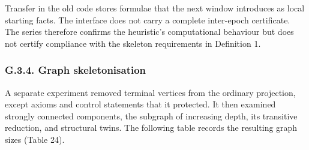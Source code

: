 \documentclass[pdflatex,sn-basic,Numbered]{sn-jnl}
\begin{document}
Transfer in the old code stores formulae that the next window introduces as local starting facts. The interface does not carry a complete inter-epoch certificate. The series therefore confirms the heuristic's computational behaviour but does not certify compliance with the skeleton requirements in Definition 1.

\subsubsection*{G.3.4. Graph skeletonisation}\label{g.3.4.-graph-skeletonisation}

A separate experiment removed terminal vertices from the ordinary projection, except axioms and control statements that it protected. It then examined strongly connected components, the subgraph of increasing depth, its transitive reduction, and structural twins. The following table records the resulting graph sizes (Table 24).

\begingroup
\small
\setlength{\tabcolsep}{3pt}
\renewcommand{\arraystretch}{1.13}
\end{document}
